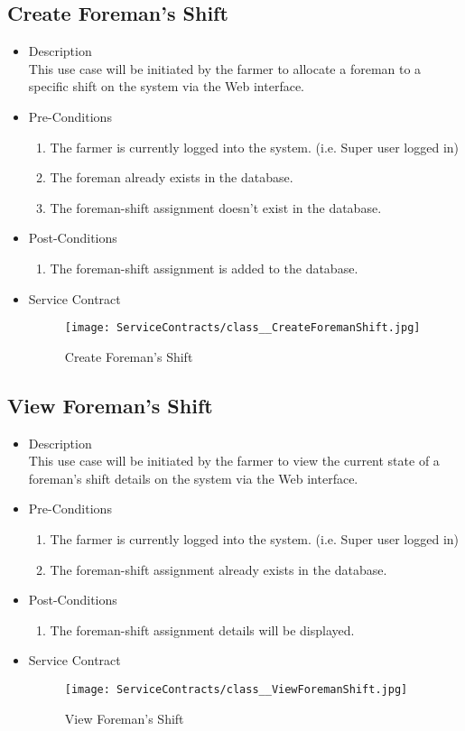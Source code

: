 \documentclass[11pt,fleqn]{book} %
\begin{document}
\subsection{Create Foreman’s Shift}
\begin{itemize}
	\item Description\\
	This use case will be initiated by the farmer to allocate a foreman to a specific shift on the system via the Web interface.
	\item Pre-Conditions
	\begin{enumerate}
		\item The farmer is currently logged into the system. (i.e. Super user logged in)
		\item The foreman already exists in the database. 
		\item The foreman-shift assignment doesn’t exist in the database.					
	\end{enumerate}
	\item Post-Conditions
	\begin{enumerate}
		\item The foreman-shift assignment is added to the database.
	\end{enumerate}
	\item Service Contract
	\begin{figure}
		\texttt{[image: ServiceContracts/class\_\_CreateForemanShift.jpg]}
		\caption{Create Foreman’s Shift}
	\end{figure}
\end{itemize}

\subsection{View Foreman’s Shift}
\begin{itemize}
	\item Description\\
	This use case will be initiated by the farmer to view the current state of a foreman’s shift details on the system via the Web interface.
	\item Pre-Conditions
	\begin{enumerate}
		\item The farmer is currently logged into the system. (i.e. Super user logged in)
		\item The foreman-shift assignment already exists in the database.		
	\end{enumerate}
	\item Post-Conditions
	\begin{enumerate}
		\item The foreman-shift assignment details will be displayed.
	\end{enumerate}
	\item Service Contract
		\begin{figure}
			\texttt{[image: ServiceContracts/class\_\_ViewForemanShift.jpg]}
			\caption{View Foreman’s Shift}
		\end{figure}
\end{itemize}
\end{document}
